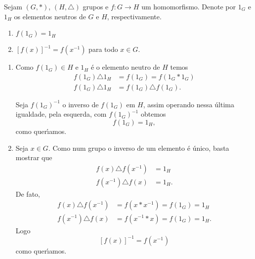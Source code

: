 \begin{proposicao}
    Sejam $(G, *)$, $(H, \triangle)$ grupos e $f : G \to H$ um homomorfismo. Denote por $1_G$ e $1_H$ os elementos neutros de $G$ e $H$, respectivamente.
    \begin{enumerate}[label={\roman*})]
        \item $f(1_G) = 1_H$
        \item $[f(x)]^{-1} = f(x^{-1})$ para todo $x \in G$.
    \end{enumerate}
\end{proposicao}
\begin{prova}
    \begin{enumerate}[label={\roman*})]
        \item Como $f(1_G) \in H$ e $1_H$ \'e o elemento neutro de $H$ temos
        \begin{align*}
            f(1_G) \triangle 1_H &= f(1_G) = f(1_G * 1_G)\\
            f(1_G) \triangle 1_H &= f(1_G) \triangle f(1_G).
        \end{align*}

        Seja $f(1_G)^{-1}$ o inverso de $f(1_G)$ em $H$, assim operando nessa \'ultima igualdade, pela esquerda, com $f(1_G)^{-1}$ obtemos
        \[
            f(1_G) = 1_H,
        \]
        como quer{\'\i}amos.

        \item Seja $x \in G$. Como num grupo o inverso de um elemento \'e \'unico, basta mostrar que
        \begin{align*}
            f(x) \triangle f(x^{-1}) &= 1_H\\
            f(x^{-1}) \triangle f(x) &= 1_H.
        \end{align*}
        De fato,
        \begin{align*}
            f(x) \triangle f(x^{-1}) &= f(x * x^{-1}) = f(1_G) = 1_H\\
            f(x^{-1}) \triangle f(x) &= f(x^{-1} * x) = f(1_G) = 1_H.
        \end{align*}
        Logo
        \[
            [f(x)]^{-1} = f(x^{-1})
        \]
        como quer{\'\i}amos.
    \end{enumerate}
\end{prova}

